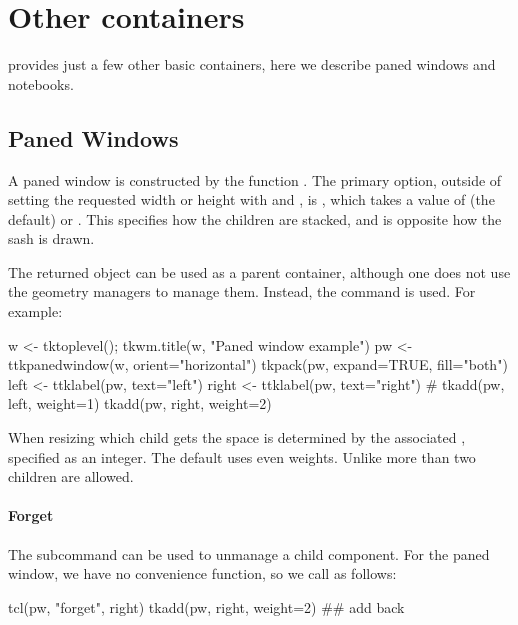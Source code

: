 \section{Other containers}
\label{sec:tcltk:other-containers}
\TK\/ provides just a few other basic containers, here we describe paned windows and notebooks.

\subsection{Paned Windows}
\label{sec:tcltk:paned-windows}

A paned window is constructed by the function
. The primary option, outside of setting
the requested width or height with  and
, is ,
which takes a value of  (the default) or
. This specifies how the children are stacked, and
is opposite how the sash is drawn.

The returned object can be used as a parent container, although one
does not use the geometry managers to manage them. Instead, the
 command is used. For example:
\begin{Schunk}
\begin{Sinput}
 w <- tktoplevel(); tkwm.title(w, "Paned window example")
 pw <- ttkpanedwindow(w, orient="horizontal")
 tkpack(pw, expand=TRUE, fill="both")
 left <- ttklabel(pw, text="left")
 right <- ttklabel(pw, text="right")
 #
 tkadd(pw, left, weight=1)
 tkadd(pw, right, weight=2)
\end{Sinput}
\end{Schunk}
%
When resizing which child gets the space is determined by the
associated , specified as an integer. The default uses
even weights.  Unlike \GTK\/ more than two children are allowed.

\paragraph{Forget}
The subcommand  can be used to
unmanage a child component. For the paned window, we have no
convenience function, so we call as follows:
\begin{Schunk}
\begin{Sinput}
 tcl(pw, "forget", right)
 tkadd(pw, right, weight=2) ## add back
\end{Sinput}
\end{Schunk}
%

